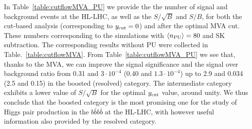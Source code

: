 In Table~\ref{table:cutflowMVA_PU}
we provide the  the number of signal and
    background events at the HL-LHC, as well as the $S/\sqrt{B}$ and $S/B$,
    for both the cut-based analysis (corresponding
    to $y_{\rm cut}=0$) and after the
    optimal MVA cut.
    These numbers corresponding to the simulations
    with $\left\langle n_{\rm PU}\right\rangle=80$
    and SK subtraction.
    The corresponding results without PU were collected
    in Table.~\ref{table:cutflowMVA}.
    From Table~\ref{table:cutflowMVA_PU} we see that, thanks
to the MVA, we can improve the signal significance and the
signal over background ratio from 0.31 and $3\cdot 10^{-4}$
(0.40 and $1.3\cdot 10^{-4}$) up to 2.9 and 0.034 (2.5 and 0.15)
in the boosted (resolved) category.
%
The intermediate category exhibits a lower value of $S/\sqrt{B}$
for the optimal $y_{\rm cut}$ value, around unity.
%
We thus conclude that the boosted category is the most promising
one for the study of Higgs pair production in the $b\bar{b}b\bar{b}$
at the HL-LHC, with however useful information also provided
by the resolved category.
 


